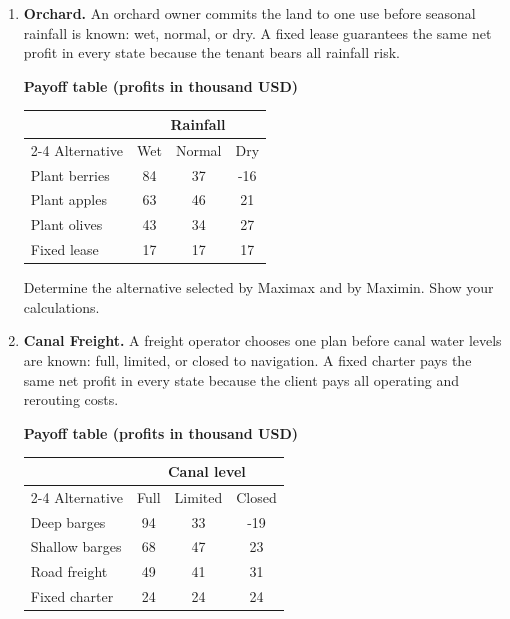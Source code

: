 \begin{enumerate}[leftmargin=0.25in, itemsep=0pt, parsep=3pt]
Determine the alternative selected by Maximax and by Maximin. Show your calculations.
\par\vfill

\newpage

\item \textbf{Orchard.} An orchard owner commits the land to one use before seasonal rainfall is known: wet, normal, or dry. A fixed lease guarantees the same net profit in every state because the tenant bears all rainfall risk.

\begin{center}
\textbf{Payoff table (profits in thousand USD)}\\[3pt]
\begin{tabular}{lccc}
\toprule
& \multicolumn{3}{c}{Rainfall} \\
\cmidrule(lr){2-4}
Alternative & Wet & Normal & Dry \\
\midrule
Plant berries & 84 & 37 & -16 \\
Plant apples & 63 & 46 & 21 \\
Plant olives & 43 & 34 & 27 \\
Fixed lease & 17 & 17 & 17 \\
\bottomrule
\end{tabular}
\end{center}

Determine the alternative selected by Maximax and by Maximin. Show your calculations.
\par\vfill

\item \textbf{Canal Freight.} A freight operator chooses one plan before canal water levels are known: full, limited, or closed to navigation. A fixed charter pays the same net profit in every state because the client pays all operating and rerouting costs.

\begin{center}
\textbf{Payoff table (profits in thousand USD)}\\[3pt]
\begin{tabular}{lccc}
\toprule
& \multicolumn{3}{c}{Canal level} \\
\cmidrule(lr){2-4}
Alternative & Full & Limited & Closed \\
\midrule
Deep barges & 94 & 33 & -19 \\
Shallow barges & 68 & 47 & 23 \\
Road freight & 49 & 41 & 31 \\
Fixed charter & 24 & 24 & 24 \\
\bottomrule
\end{tabular}
\end{center}


\end{enumerate}
